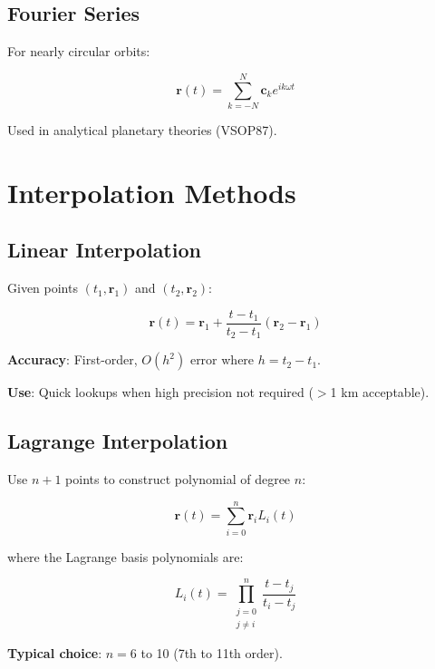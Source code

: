 \subsection{Fourier Series}

For nearly circular orbits:

\begin{equation}
    \mathbf{r}(t) = \sum_{k=-N}^{N} \mathbf{c}_k e^{ik\omega t}
\end{equation}

Used in analytical planetary theories (VSOP87).

\section{Interpolation Methods}

\subsection{Linear Interpolation}

Given points $(t_1, \mathbf{r}_1)$ and $(t_2, \mathbf{r}_2)$:

\begin{equation}
    \mathbf{r}(t) = \mathbf{r}_1 + \frac{t - t_1}{t_2 - t_1}(\mathbf{r}_2 - \mathbf{r}_1)
\end{equation}

\textbf{Accuracy}: First-order, $O(h^2)$ error where $h = t_2 - t_1$.

\textbf{Use}: Quick lookups when high precision not required ($>$1 km acceptable).

\subsection{Lagrange Interpolation}

Use $n+1$ points to construct polynomial of degree $n$:

\begin{equation}
    \mathbf{r}(t) = \sum_{i=0}^{n} \mathbf{r}_i L_i(t)
\end{equation}

where the Lagrange basis polynomials are:

\begin{equation}
    L_i(t) = \prod_{\substack{j=0\\j\neq i}}^{n} \frac{t - t_j}{t_i - t_j}
\end{equation}

\textbf{Typical choice}: $n = 6$ to 10 (7th to 11th order).

